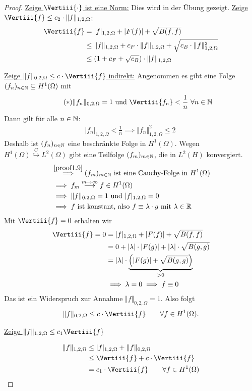 \begin{proof}\enter
	\underline{Zeige $\Vertiii{\cdot}$ ist eine Norm:}
Dies wird in der Übung gezeigt.\enter \enter
\underline{Zeige $\Vertiii{f}\leq c_2\cdot\Vert f\Vert_{1,2,\Omega}$:}
\begin{align*}
\Vertiii{f} &=
|f|_{1,2,\Omega}+|F(f)|+\sqrt{B(f,f)}\\
&\leq
\Vert f\Vert_{1,2,\Omega} +c_F\cdot\Vert f\Vert_{1,2,\Omega}+\sqrt{c_B\cdot\Vert f\Vert^2_{1,2,\Omega}}\\
&\leq
(1+c_F+\sqrt{c_B})\cdot\Vert f\Vert_{1,2,\Omega}
\end{align*}

\underline{Zeige $\Vert f\Vert_{0,2,\Omega}\leq c\cdot\Vertiii{f}$ indirekt:}
Angenommen es gibt eine Folge $(f_n)_{n\in\mathbb{N}}\subseteq H^1(\Omega)$ mit
\begin{align}\label{proof1.9}\tag{$\ast$}
\Vert f_n\Vert_{0,2,\Omega}=1\text{ und }\Vertiii{f_n}<\frac{1}{n}~\forall n\in\N
\end{align}
Dann gilt für alle $n\in\mathbb{N}$:
\begin{align*}
|f_n|_{1,2,\Omega}<\frac{1}{n}
\implies
\Vert f_n\Vert^2_{1,2,\Omega}\leq 2\
\end{align*}
Deshalb ist $(f_n)_{n\in\mathbb{N}}$ eine beschränkte Folge in $H^1(\Omega)$. Wegen $H^1(\Omega)\stackrel{C}{\hookrightarrow} L^2(\Omega)$ gibt eine Teilfolge $(f_m)_{m\in\mathbb{N}}$, die in $L^2(H)$ konvergiert.
\begin{align*}
&\stackrel{\eqref{proof1.9}}{\implies}
(f_m)_{m\in\mathbb{N}}\text{ ist eine Cauchy-Folge in }H^1(\Omega)\\
&\implies
 f_m\stackrel{m\to\infty}{\longrightarrow} f\in H^1(\Omega)\\
 &\implies
 \Vert f\Vert_{0,2,\Omega}=1\text{ und } |f|_{1,2,\Omega}=0\\
 &\implies
 f\text{ ist konstant, also } f\equiv \lambda\cdot g\text{ mit }\lambda\in\mathbb{R}
\end{align*}
Mit $\Vertiii{f}=0$ erhalten wir
\begin{align*}
\Vertiii{f} = 0 
&=|f|_{1,2,\Omega}+|F(f)|+\sqrt{B(f,f)}\\
&=0+|\lambda|\cdot|F(g)|+|\lambda|\cdot\sqrt{B(g,g)}\\
&=|\lambda|\cdot\underbrace{\Big(|F(g)|+\sqrt{B(g,g)}\Big)}_{>0}\\
&\implies\lambda=0\implies f\equiv 0
\end{align*}
Das ist ein Widerspruch zur Annahme $\Vert f\Vert_{0,2,\Omega}=1$. Also folgt
\begin{align*}
\Vert f\Vert_{0,2,\Omega}\leq c\cdot\Vertiii{f}\qquad\forall f\in H^1(\Omega).
\end{align*}

\underline{Zeige $\|f\|_{1,2,\Omega}\leq c_1 \Vertiii{f}$}

\begin{align*}
\Vert f\Vert_{1,2,\Omega}
&\leq
|f|_{1,2,\Omega}+\Vert f\Vert_{0,2,\Omega}\\
&\leq
\Vertiii{f}+c\cdot\Vertiii{f}\\
&=c_1\cdot\Vertiii{f}\qquad\forall f\in H^1(\Omega)
\end{align*}
\end{proof}

